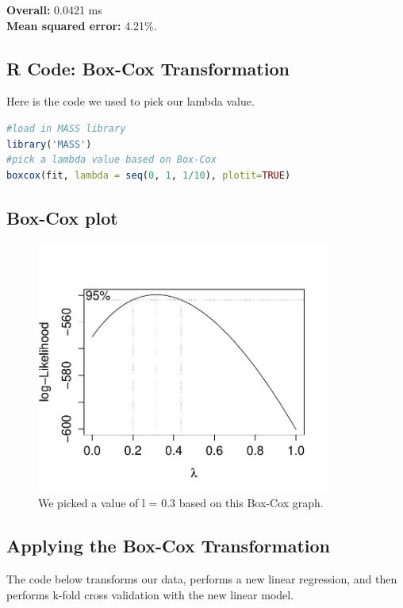 \documentclass{article}
\begin{document}
\noindent
\textbf{Overall:} 0.0421 ms \\
\textbf{Mean squared error:} 4.21\%.

\subsection{R Code: Box-Cox Transformation}
Here is the code we used to pick our lambda value.

\begin{lstlisting}[language=r]
#load in MASS library
library('MASS')
#pick a lambda value based on Box-Cox
boxcox(fit, lambda = seq(0, 1, 1/10), plotit=TRUE)
\end{lstlisting}

\subsection{Box-Cox plot}
\begin{figure}[H]
\centering
\includegraphics[width=3.8in]{boxcox.pdf}
\caption{We picked a value of l = 0.3 based on this Box-Cox graph.}
\end{figure}

\subsection{Applying the Box-Cox Transformation}
The code below transforms our data, performs a new linear regression, and then
performs k-fold cross validation with the new linear model. 
\end{document}
